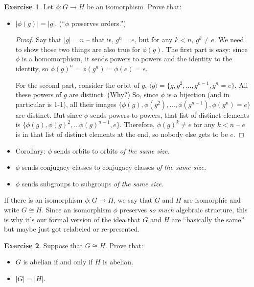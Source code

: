 \documentclass[12pt]{article}
\theoremstyle{definition} %
\newtheorem*{exercise}{Exercise}
\newcommand{\Alert}[1]{\textcolor{xRed}{#1}}
\def\<{\langle}
\def\>{\rangle}
\begin{document}
\begin{exercise} Let $\phi:G\to H$ be an isomorphism. Prove that:
    \begin{itemize}
        \item $|\phi(g)| = |g|$. (``$\phi$ preserves orders.'')
        \begin{proof}
            Say that $|g| = n$ -- that is, $g^n = e$, but for any $k < n$, $g^k \neq e$. We need to show those two things are also true for $\phi(g)$. The first part is easy: since $\phi$ is a homomorphism, it sends powers to powers and the identity to the identity, so $\phi(g)^n = \phi(g^n) = \phi(e) = e$.

            For the second part, consider the orbit of $g$, $\<g\> = \{g, g^2, \ldots, g^{n-1}, g^n = e\}$. All these powers of $g$ are distinct. (Why?) So, since $\phi$ is a bijection (and in particular is 1-1), all their images $\{\phi(g), \phi(g^2), \ldots, \phi(g^{n-1}), \phi(g^n) = e\}$ are distinct. But since $\phi$ sends powers to powers, that list of distinct elements is $\{\phi(g), \phi(g)^2, \ldots \phi(g)^{n-1}, e\}$. Therefore, $\phi(g)^k\neq e$ for any $k < n$ -- $e$ is in that list of distinct elements at the end, so nobody else gets to be $e$.
        \end{proof}
        \item Corollary: $\phi$ sends orbits to orbits \textit{of the same size.}
        \item $\phi$ sends conjugacy classes to conjugacy classes \textit{of the same size.}
        \item $\phi$ sends subgroups to subgroups \textit{of the same size.}
    \end{itemize}
\end{exercise}

If there is an isomorphism $\phi:G \to H$, we say that $G$ and $H$ are \Alert{isomorphic} and write $G\cong H$. Since an isomorphism $\phi$ preserves \textit{so much} algebraic structure, this is why it's our formal version of the idea that $G$ and $H$ are ``basically the same'' but maybe just got relabeled or re-presented.

\begin{exercise} Suppose that $G\cong H$. Prove that:
    \begin{itemize}
        \item $G$ is abelian if and only if $H$ is abelian.
        \item $|G| = |H|$.
    \end{itemize}
\end{exercise}
\end{document}
